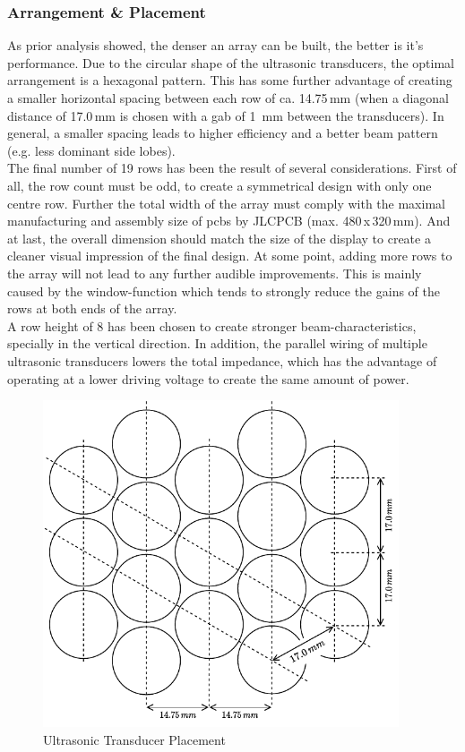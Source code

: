 \subsubsection{Arrangement \& Placement}
As prior analysis showed, the denser an array can be built, the better is it's performance. Due to the circular shape of the ultrasonic transducers, the optimal arrangement is a hexagonal pattern. This has some further advantage of creating a smaller horizontal spacing between each row of ca. 14.75\,mm (when a diagonal distance of 17.0\,mm is chosen with a gab of 1\, mm between the transducers). In general, a smaller spacing leads to higher efficiency and a better beam pattern (e.g. less dominant side lobes).\\
The final number of 19 rows has been the result of several considerations. First of all, the row count must be odd, to create a symmetrical design with only one centre row. Further the total width of the array must comply with the maximal manufacturing and assembly size of \acrshort{pcb}s by JLCPCB (max. 480\,x\,320\,mm). And at last, the overall dimension should match the size of the display to create a cleaner visual impression of the final design. At some point, adding more rows to the array will not lead to any further audible improvements. This is mainly caused by the window-function which tends to strongly reduce the gains of the rows at both ends of the array.\\
A row height of 8 has been chosen to create stronger beam-characteristics, specially in the vertical direction. In addition, the parallel wiring of multiple ultrasonic transducers lowers the total impedance, which has the advantage of operating at a lower driving voltage to create the same amount of power.

\bigskip
\begin{figure}[h!]
	\centering
	\includegraphics[width=10.5cm]{images/4_Design/Hardware/Transducer Placement.pdf}
	\vspace{0.2cm}
    \caption{Ultrasonic Transducer Placement}
    \label{fig:transducer-placement}
\end{figure}
\newpage

